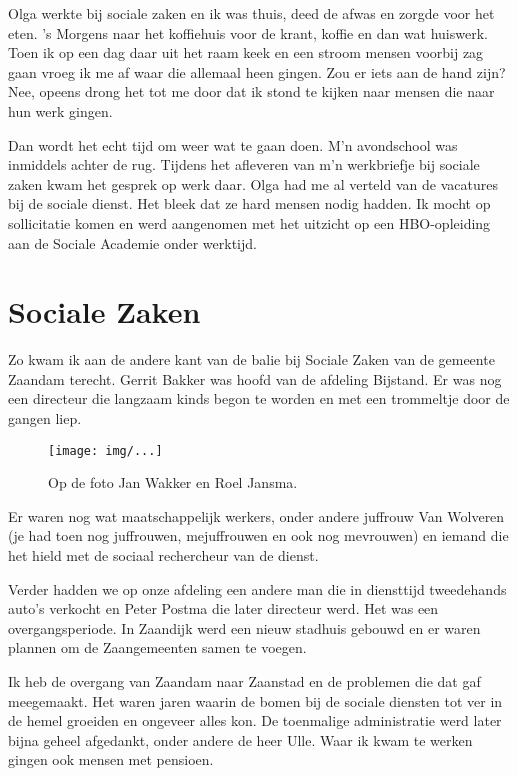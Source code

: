 \documentclass[10pt,twoside,openright]{memoir}
\begin{document}
Olga werkte bij sociale zaken en ik was thuis, deed de afwas en zorgde voor het eten. 's Morgens naar het koffiehuis voor de krant, koffie en dan wat huiswerk. Toen ik op een dag daar uit het raam keek en een stroom mensen voorbij zag gaan vroeg ik  me af waar die allemaal heen gingen. Zou er iets aan de hand zijn? Nee, opeens drong het tot me door dat ik stond te kijken naar mensen die naar hun werk gingen. 

Dan wordt het echt tijd om weer wat te gaan doen. M'n avondschool was inmiddels achter de rug. Tijdens het afleveren van m'n werkbriefje bij sociale zaken kwam het gesprek op werk daar. Olga had me al verteld van de vacatures bij de sociale dienst. Het bleek dat ze hard mensen nodig hadden. Ik mocht op sollicitatie komen en werd aangenomen met het uitzicht op een HBO-opleiding aan de Sociale Academie onder werktijd. 

\chapter{Sociale Zaken} %
\label{cha:socialezaken}

Zo kwam ik aan de andere kant van de balie bij Sociale Zaken van de gemeente Zaandam terecht. Gerrit Bakker was hoofd van de afdeling Bijstand. Er was nog een directeur die langzaam kinds begon te worden en met een trommeltje door de gangen liep. 

\begin{figure}[t]
\texttt{[image: img/...]}
\caption{Op de foto Jan Wakker en Roel Jansma.}
\end{figure}

Er waren nog wat maatschappelijk werkers, onder andere juffrouw Van Wolveren (je had toen nog juffrouwen, mejuffrouwen en ook nog mevrouwen) en iemand die het hield met de sociaal rechercheur van de dienst. 

Verder hadden we op onze afdeling een andere man die in diensttijd tweedehands auto’s verkocht en Peter Postma die later directeur werd. Het was een overgangsperiode. In Zaandijk werd een nieuw stadhuis gebouwd en er waren plannen om de Zaangemeenten samen te voegen.

Ik heb de overgang van Zaandam naar Zaanstad en de problemen die dat gaf meegemaakt. Het waren jaren waarin de bomen bij de sociale diensten tot ver in de hemel groeiden en ongeveer alles kon. De toenmalige administratie werd later bijna geheel afgedankt, onder andere de heer Ulle. Waar ik kwam te werken gingen ook mensen met pensioen.
\end{document}
